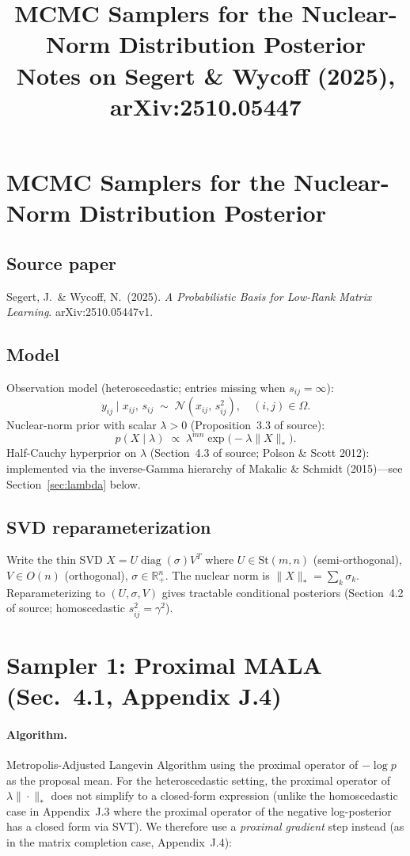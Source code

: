 \documentclass[11pt]{article}
\title{MCMC Samplers for the Nuclear-Norm Distribution Posterior\\
\large Notes on Segert \& Wycoff (2025), arXiv:2510.05447}
\author{}
\date{}
\begin{document}
\maketitle

\section*{MCMC Samplers for the Nuclear-Norm Distribution Posterior}

\subsection*{Source paper}
Segert, J.\ \& Wycoff, N.\ (2025).
\emph{A Probabilistic Basis for Low-Rank Matrix Learning}.
arXiv:2510.05447v1.

\subsection*{Model}
Observation model (heteroscedastic; entries missing when $s_{ij}=\infty$):
\[
  y_{ij} \mid x_{ij},\, s_{ij}
  \;\sim\; \mathcal{N}(x_{ij},\, s_{ij}^2), \quad (i,j)\in\Omega.
\]
Nuclear-norm prior with scalar $\lambda>0$ (Proposition~3.3 of source):
\[
  p(X \mid \lambda) \;\propto\; \lambda^{mn}\exp\!\bigl(-\lambda\|X\|_*\bigr).
\]
Half-Cauchy hyperprior on $\lambda$ (Section~4.3 of source; Polson \& Scott 2012):
implemented via the inverse-Gamma hierarchy of Makalic \& Schmidt (2015)---see
Section~\ref{sec:lambda} below.

\subsection*{SVD reparameterization}
Write the thin SVD $X = U\operatorname{diag}(\sigma)V^T$ where
$U\in\mathrm{St}(m,n)$ (semi-orthogonal), $V\in O(n)$ (orthogonal),
$\sigma\in\mathbb{R}^n_+$.  The nuclear norm is $\|X\|_*=\sum_k\sigma_k$.
Reparameterizing to $(U,\sigma,V)$ gives tractable conditional posteriors
(Section~4.2 of source; homoscedastic $s_{ij}^2=\gamma^2$).


\section*{Sampler 1: Proximal MALA (Sec.\ 4.1, Appendix J.4)}

\paragraph{Algorithm.}
Metropolis-Adjusted Langevin Algorithm using the proximal operator of
$-\log p$ as the proposal mean.  For the heteroscedastic setting, the
proximal operator of $\lambda\|\cdot\|_*$ does not simplify to a closed-form
expression (unlike the homoscedastic case in Appendix~J.3 where the proximal
operator of the negative log-posterior has a closed form via SVT).  We
therefore use a \emph{proximal gradient} step instead (as in the matrix
completion case, Appendix~J.4):
\end{document}
